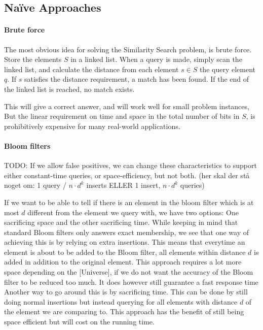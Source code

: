 \documentclass[a4paper,11pt]{article}
\begin{document}
\subsection{Naïve Approaches}

\paragraph{Brute force}
The most obvious idea for solving the Similarity Search problem, is brute force. Store the elements $S$ in a linked list. When a query is made, simply scan the linked list, and calculate the distance from each element $s \in S$ the query element $q$. If $s$ satisfies the distance requirement, a match has been found. If the end of the linked list is reached, no match exists.

This will give a correct answer, and will work well for small problem instances, But the linear requirement on time and space in the total number of bits in $S$, is prohibitively expensive for many real-world applications.

\paragraph{Bloom filters} TODO: If we allow false positives, we can change these characteristics to support either constant-time queries, or space-efficiency, but not both. (her skal der stå noget om: 1 query / $n\cdot d^k$ inserts ELLER 1 insert, $n \cdot d^k$ queries)

If we want to be able to tell if there is an element in the bloom filter which is at most $d$ different from the element we query with, we have two options: One sacrificing space and the other sacrificing time. While keeping in mind that standard Bloom filters only answers exact membership, we see that one way of achieving this is by relying on extra insertions. This means that everytime an element is about to be added to the Bloom filter, all elements within distance $d$ is added in addition to the original element. This approach requires a lot more space depending on the [Universe], if we do not want the accuracy of the Bloom filter to be reduced too much. It does however still guarantee a fast response time\\

Another way to go around this is by sacrificing time. This can be done by still doing normal insertions but instead querying for all elements with distance $d$ of the element we are comparing to. This approach has the benefit of still being space efficient but will cost on the running time.
\end{document}
